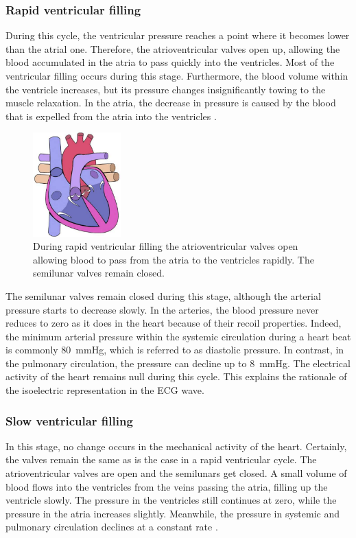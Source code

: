 \subsubsection{Rapid ventricular filling}
During this cycle, the ventricular pressure reaches a point where it becomes lower than the atrial one. Therefore, the atrioventricular valves open up, allowing the blood accumulated in the atria to pass quickly into the ventricles. Most of the ventricular filling occurs during this stage. Furthermore, the blood volume within the ventricle increases, but its pressure changes insignificantly towing to the muscle relaxation. In the atria, the decrease in pressure is caused by the blood that is expelled from the atria into the ventricles \cite{Hall:2015aa}. 

\begin{figure}[!htpb]
	\centering
	\includegraphics[height=4cm,keepaspectratio]{figure_12}
	\caption[Heart during rapid ventricular filling]{During rapid ventricular filling the atrioventricular valves open allowing blood to pass from the atria to the ventricles rapidly. The semilunar valves remain closed.}
	\label{fig:heart rapid ventricular filling}
\end{figure}

The semilunar valves remain closed during this stage, although the arterial pressure starts to decrease slowly. In the arteries, the blood pressure never reduces to zero as it does in the heart because of their recoil properties. Indeed, the minimum arterial pressure within the systemic circulation during a heart beat is commonly \SI{80}{\mmHg}, which is referred to as diastolic pressure. In contrast, in the pulmonary circulation, the pressure can decline up to \SI{8}{\mmHg}. The electrical activity of the heart remains null during this cycle. This explains the rationale of the isoelectric representation in the ECG wave.


\subsubsection{Slow ventricular filling}
In this stage, no change occurs in the mechanical activity of the heart. Certainly, the valves remain the same as is the case in a rapid ventricular cycle. The atrioventricular valves are open and the semilunars get closed. A small volume of blood flows into the ventricles from the veins passing the atria, filling up the ventricle slowly. The pressure in the ventricles still continues at zero, while the pressure in the atria increases slightly. Meanwhile, the pressure in systemic and pulmonary circulation declines at a constant rate \cite{Hall:2015aa}. 

